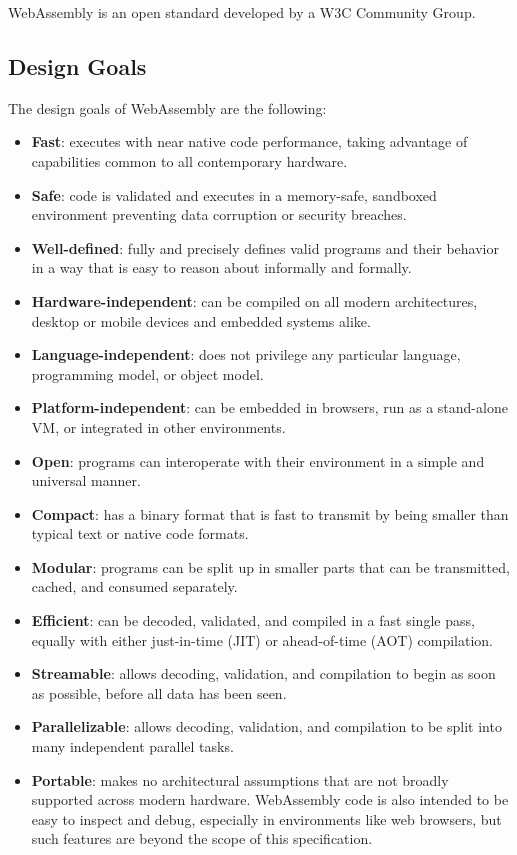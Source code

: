 WebAssembly is an open standard developed by a W3C Community Group.

\subsection{Design Goals} \mbox{}

\indent The design goals of WebAssembly are the following:

\begin{itemize} 
  \item \textbf{Fast}: executes with near native code performance, taking advantage of capabilities common to all contemporary hardware.
  \item \textbf{Safe}: code is validated and executes in a memory-safe, sandboxed environment preventing data corruption or security breaches.
  \item \textbf{Well-defined}: fully and precisely defines valid programs and their behavior in a way that is easy to reason about informally and formally.
  \item \textbf{Hardware-independent}: can be compiled on all modern architectures, desktop or mobile devices and embedded systems alike.
  \item \textbf{Language-independent}: does not privilege any particular language, programming model, or object model.
  \item \textbf{Platform-independent}: can be embedded in browsers, run as a stand-alone VM, or integrated in other environments.
  \item \textbf{Open}: programs can interoperate with their environment in a simple and universal manner.
  \item \textbf{Compact}: has a binary format that is fast to transmit by being smaller than typical text or native code formats.
  \item \textbf{Modular}: programs can be split up in smaller parts that can be transmitted, cached, and consumed separately.
  \item \textbf{Efficient}: can be decoded, validated, and compiled in a fast single pass, equally with either just-in-time (JIT) or ahead-of-time (AOT) compilation.
  \item \textbf{Streamable}: allows decoding, validation, and compilation to begin as soon as possible, before all data has been seen.
  \item \textbf{Parallelizable}: allows decoding, validation, and compilation to be split into many independent parallel tasks.
  \item \textbf{Portable}: makes no architectural assumptions that are not broadly supported across modern hardware. WebAssembly code is also intended to be easy to inspect and debug, especially in environments like web browsers, but such features are beyond the scope of this specification.
\end{itemize}


